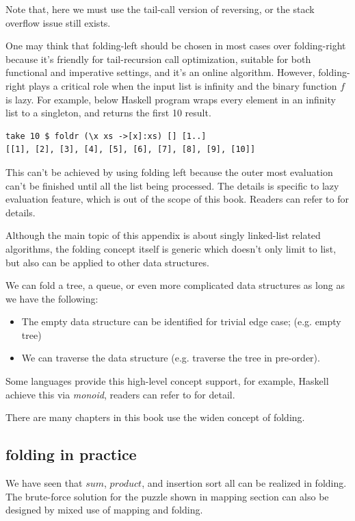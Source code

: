 \documentclass[b5paper]{article}
\begin{document}
Note that, here we must use the tail-call version of reversing, or the stack overflow issue still exists.

One may think that folding-left should be chosen in most cases over folding-right because it's friendly for
tail-recursion call optimization, suitable for both functional and imperative settings, and it's an online
algorithm. However, folding-right plays a critical role when the input list is infinity and the binary function
$f$ is lazy. For example, below Haskell program wraps every element in an infinity list to a singleton, and
returns the first 10 result.

\lstset{language=Haskell}
\begin{lstlisting}
take 10 $ foldr (\x xs ->[x]:xs) [] [1..]
[[1], [2], [3], [4], [5], [6], [7], [8], [9], [10]]
\end{lstlisting} %

This can't be achieved by using folding left because the outer most evaluation can't be finished until
all the list being processed. The details is specific to lazy evaluation feature, which is out of the
scope of this book. Readers can refer to \cite{Haskell-wiki} for details.

Although the main topic of this appendix is about singly linked-list related algorithms, the folding
concept itself is generic which doesn't only limit to list, but also can be applied to other data structures.

We can fold a tree, a queue, or even more complicated data structures as long as we have the following:

\begin{itemize}
\item The empty data structure can be identified for trivial edge case; (e.g. empty tree)
\item We can traverse the data structure (e.g. traverse the tree in pre-order).
\end{itemize}

Some languages provide this high-level concept support, for example, Haskell achieve this via
{\em monoid}, readers can refer to \cite{learn-haskell} for detail.

There are many chapters in this book use the widen concept of folding.

\subsection{folding in practice}

We have seen that $sum$, $product$, and insertion sort all can be realized in folding. The
brute-force solution for the puzzle shown in mapping section can also be
designed by mixed use of mapping and folding.
\end{document}
